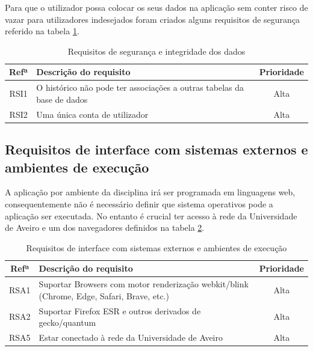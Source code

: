 \documentclass[12pt, twoside]{report}
\begin{document}
	Para que o utilizador possa colocar os seus dados na aplicação sem conter risco de vazar para utilizadores indesejados foram criados alguns requisitos de segurança referido na	tabela \ref{requisitosdeseguranca}.
	
\begin{table}[H]	
	\caption{Requisitos de segurança e integridade dos dados}
	
	
	\begin{center}
		\begin{tabularx}{\textwidth}{|c|X|c|}
			\hline
			\textbf{Refª }	& \textbf{Descrição do requisito} & \textbf{Prioridade} \\
			\hline
			RSI1 &O histórico não pode ter associações a outras tabelas da base de dados  &Alta\\
			\hline
			RSI2 & Uma única conta de utilizador&Alta\\
			\hline
		\end{tabularx}
		\label{requisitosdeseguranca}
	\end{center}
\end{table}


	\subsection{Requisitos de interface com sistemas externos e ambientes de execução}
	
	A aplicação por ambiente da disciplina irá ser programada em linguagens web,
	consequentemente não é necessário definir que sistema operativos pode a aplicação ser executada.
	No entanto é crucial ter acesso à rede da Universidade de Aveiro e um dos navegadores definidos na tabela \ref{requisitosdesistemas}.
	
	\def\arraystretch{1.5}
	\begin{table}[H]
		\caption{Requisitos de interface com sistemas externos e ambientes de execução}
		\begin{center}
			\begin{tabularx}{\textwidth}{|c|X|c|}
				\hline
				\textbf{Refª }	& \textbf{Descrição do requisito} & \textbf{Prioridade}\\
				\hline
				RSA1 & Suportar Browsers com motor renderização webkit/blink (Chrome, Edge, Safari, Brave, etc.)  & Alta \\
				\hline
				RSA2 & Suportar Firefox ESR e outros derivados de gecko/quantum & Alta \\
				\hline
				RSA5 & Estar conectado à rede da Universidade de Aveiro & Alta\\
				\hline
			\end{tabularx}
			\label{requisitosdesistemas}
		\end{center}
	\end{table}
		
\end{document}
